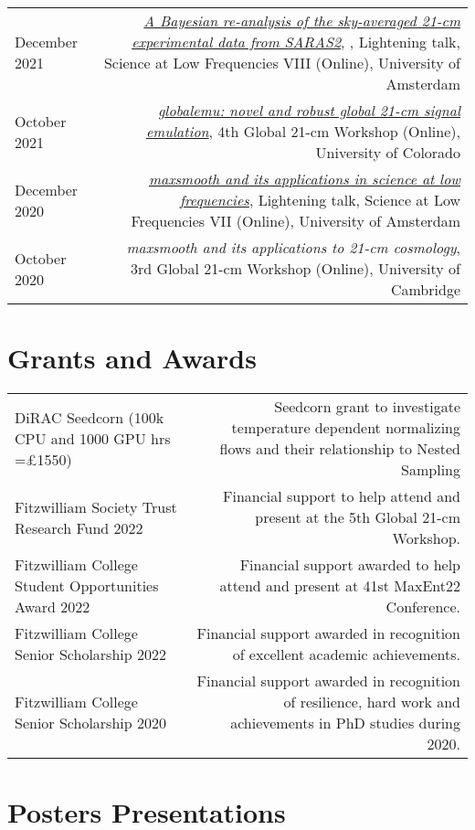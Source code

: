 \documentclass{article}
\begin{document}
\begin{tabular}{L!{\vrule}R}
	December 2021 & \href{https://www.youtube.com/watch?v=93KCp7rHcGA&list=PLZL7YmXBBHPDCyNfJcWwP78GgacY_Og4E&index=23}{\textit{A Bayesian re-analysis of the sky-averaged 21-cm experimental data from SARAS2}}, , Lightening talk, Science at Low Frequencies VIII (Online), University of Amsterdam \\
	October 2021 & \href{https://www.youtube.com/watch?v=862NuVyF33k&list=PLF7c7ri2hrnGlwbn4JLc0PWbncSeARdTP&index=4}{\textit{globalemu: novel and robust global 21-cm signal emulation}}, 4th Global 21-cm Workshop (Online), University of Colorado \\
	December 2020 & \href{https://www.youtube.com/watch?v=Yw6_IInwTNE}{\textit{maxsmooth and its applications in science at low frequencies}}, Lightening talk, Science at Low Frequencies VII (Online), University of Amsterdam \\
	October 2020 & \textit{maxsmooth and its applications to 21-cm cosmology}, 3rd Global 21-cm Workshop (Online), University of Cambridge \\
\end{tabular}

\section*{Grants and Awards}

\begin{tabular}{l!{\vrule}r}
    DiRAC Seedcorn (100k CPU and 1000 GPU hrs =£1550) & Seedcorn grant to investigate temperature dependent normalizing flows and their relationship to Nested Sampling \\
    Fitzwilliam Society Trust Research Fund 2022 & Financial support to help attend and present at the 5th Global 21-cm Workshop. \\
	Fitzwilliam College Student Opportunities Award 2022 & Financial support awarded to help attend and present at 41st MaxEnt22 Conference. \\
	Fitzwilliam College Senior Scholarship 2022 & Financial support awarded in recognition of excellent academic achievements. \\
	Fitzwilliam College Senior Scholarship 2020 & Financial support awarded in recognition of resilience, hard work and achievements in PhD studies during 2020.
\end{tabular}

\section*{Posters Presentations}
\end{document}
